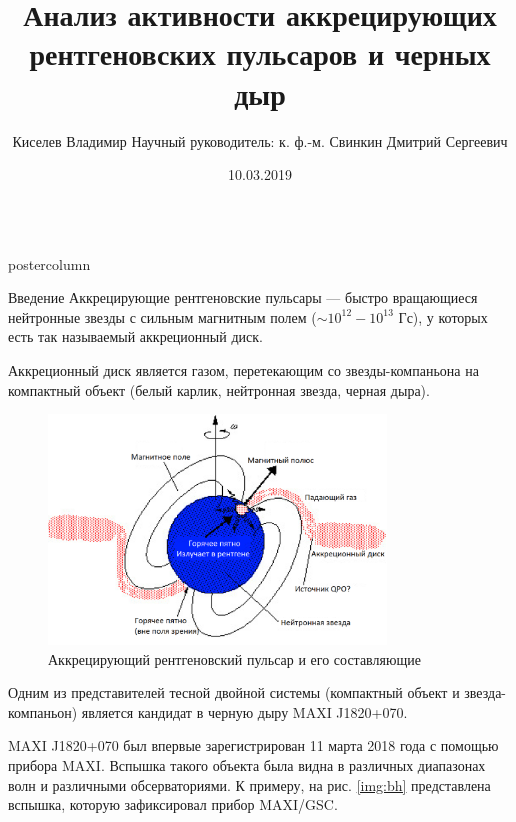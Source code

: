 \documentclass{beamer}
\title{\huge Анализ активности аккрецирующих рентгеновских пульсаров и черных дыр}
\author{Киселев Владимир \hfill Научный руководитель: к. ф.-м. Свинкин Дмитрий Сергеевич}
\institute[PTHS]{$^{1}$ Академический лицей <<Физико-техническая школа>>}
\date{10.03.2019}
\newlength{\columnheight}
\begin{document}
\begin{frame}
\begin{columns}
	\begin{column}{.43\textwidth}
		\begin{beamercolorbox}[center]{postercolumn}
			\begin{minipage}{.98\textwidth}  %
				\parbox[t][\columnheight]{\textwidth}{ %
					\begin{myblock}{Введение}
						Аккрецирующие рентгеновские пульсары --- быстро вращающиеся нейтронные звезды с сильным магнитным полем ($\sim10^{12} - 10^{13}$ Гс), у которых есть так называемый аккреционный диск.
						
						Аккреционный диск является газом, перетекающим со звезды-компаньона на компактный объект (белый карлик, нейтронная звезда, черная дыра).	
						
						\begin{figure}
							\centering
							\includegraphics[width=0.8\textwidth]{img/accretion_pulsar}			
							\caption{Аккрецирующий рентгеновский пульсар и его составляющие}
						\end{figure}
						
						\vspace{0.4em}
						
						Одним из представителей тесной двойной системы (компактный объект и звезда-компаньон) является кандидат в черную дыру MAXI J1820+070.
						
						MAXI J1820+070 был впервые зарегистрирован 11 марта 2018 года с помощью прибора MAXI. Вспышка такого объекта была видна в различных диапазонах волн и различными обсерваториями. К примеру, на рис. \ref{img:bh} представлена вспышка, которую зафиксировал прибор MAXI/GSC.
						

\end{myblock}}
\end{minipage}
\end{beamercolorbox}
\end{column}
\end{columns}
\end{frame}
\end{document}
